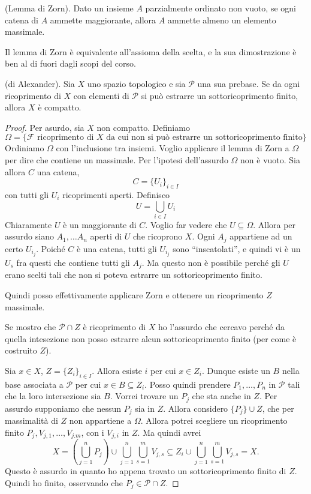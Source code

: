 \begin{thm}
    (Lemma di Zorn). Dato un insieme $A$ parzialmente ordinato non vuoto, se ogni catena di $A$ ammette maggiorante, allora $A$ ammette almeno un elemento massimale.
\end{thm}
\begin{oss}
    Il lemma di Zorn \`e equivalente all'assioma della scelta, e la sua dimostrazione \`e ben al di fuori dagli scopi del corso.
\end{oss}
\begin{thm}
    (di Alexander). Sia $X$ uno spazio topologico e sia $\mathcal{P}$ una sua prebase. Se da ogni ricoprimento di $X$ con elementi di $\mathcal{P}$ si pu\`o estrarre un sottoricoprimento finito, allora $X$ \`e compatto.
\end{thm}
\begin{proof}
    Per asurdo, sia $X$ non compatto. Definiamo
    \[
        \Omega = \{\mathcal{F} \text{ ricoprimento di $X$ da cui non si pu\`o estrarre un sottoricoprimento finito}\}
    \]
    Ordiniamo $\Omega$ con l'inclusione tra insiemi. Voglio applicare il lemma di Zorn a $\Omega$ per dire che contiene un massimale. Per l'ipotesi dell'assurdo $\Omega$ non \`e vuoto. Sia allora $C$ una catena,
    \[
        C = \{U_i\}_{i\in I}
    \]
    con tutti gli $U_i$ ricoprimenti aperti. Definisco
    \[
        U = \bigcup_{i\in I}U_i
    \]
    Chiaramente $U$ \`e un maggiorante di $C$. Voglio far vedere che $U \subseteq\Omega$. Allora per assurdo siano $A_1, \dots A_n$ aperti di $U$  che ricoprono $X$. Ogni $A_j$ appartiene ad un certo $U_{i_j}$. Poich\'e $C$ \`e una catena, tutti gli $U_{i_j}$ sono ``inscatolati'', e quindi vi \`e un $U_s$ fra questi che contiene tutti gli $A_j$. Ma questo non \`e possibile perch\'e gli $U$ erano scelti tali che non si poteva estrarre un sottoricoprimento finito.

    Quindi posso effettivamente applicare Zorn e ottenere un ricoprimento $Z$ massimale.

    Se mostro che $\mathcal{P}\cap Z$ \`e ricoprimento di $X$ ho l'assurdo che cercavo perch\'e da quella intesezione non posso estrarre alcun sottoricoprimento finito (per come \`e costruito $Z$).

    Sia $x\in X$, $Z = \{Z_i\}_{i\in I}$. Allora esiste $i$ per cui $x\in Z_i$. Dunque esiste un $B$ nella base associata a $\mathcal{P}$ per cui $x\in B\subseteq Z_i$. Posso quindi prendere $P_1, \dots, P_n$ in $\mathcal{P}$ tali che la loro intersezione sia $B$. Vorrei trovare un $P_j$ che sta anche in $Z$. Per assurdo supponiamo che nessun $P_j$ sia in $Z$. Allora considero ${\{P_j \} \cup Z}$, che per massimalit\`a di $Z$ non appartiene a $\Omega$.
    Allora potrei scegliere un ricoprimento finito $P_j, V_{j,1}, \dots, V_{j.m}$, con i $V_{j,i}$ in $Z$. Ma quindi avrei
    \[
        X = \left(\bigcup_{j=1}^nP_j\right)\cup \bigcup_{j=1}^n\bigcup_{s=1}^m V_{j,s} \subseteq Z_i \cup \bigcup_{j=1}^n\bigcup_{s=1}^m V_{j,s} = X.
    \]
    Questo \`e assurdo in quanto ho appena trovato un sottoricoprimento finito di $Z$.
    Quindi ho finito, osservando che $P_j\in \mathcal{P}\cap Z$.
\end{proof}

